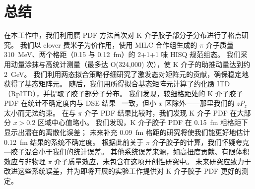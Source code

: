 \section{总结}\label{sec:summary}
在本工作中，我们利用赝 PDF 方法首次对 K 介子胶子部分子分布进行了格点研究。
我们以 clover 费米子为价作用，使用 MILC 合作组生成的 $\pi$ 介子质量 310~MeV、两个格距（0.15 与 0.12~fm）的 2+1+1 味 HISQ 规范组态。
我们采用动量涂抹与高统计测量（最多达 O(324,000) 次），使 K 介子的助推动量达到约 2~GeV。
我们利用两态拟合策略仔细研究了激发态对矩阵元的贡献，确保稳定地获得了基态矩阵元。
随后，我们用所得拟合基态矩阵元计算了约化赝 ITD（RpITD），并提取了胶子部分子分布。
我们发现，较细格距处的 K 介子胶子 PDF 在统计不确定度内与 DSE 结果~\cite{Cui:2020tdf} 一致，但小 $x$ 区除外——那里我们的 $z P_z$ 太小而无法约束。
在与 $\pi$ 介子 PDF 结果比较时，我们发现 K 介子 PDF 在大部分 $x > 0.2$ 区域中心值略小。
我们发现，K 介子胶子 PDF 在 0.15~fm 粗格距下显示出潜在的离散化误差；
未来补充 0.09~fm 格距的研究将使我们能更好地估计 0.12~fm 结果的系统不确定度。
根据此前关于 $\pi$ 介子胶子的计算，我们怀疑夸克—胶子混合小于我们的统计误差。
其他系统误差来源，如高扭度贡献、有限体积效应与非物理 $\pi$ 介子质量效应，未包含在这项开创性研究中。
未来研究应致力于改进这些系统误差，并为即将开展的实验工作提供对 K 介子胶子 PDF 更好的测定。
